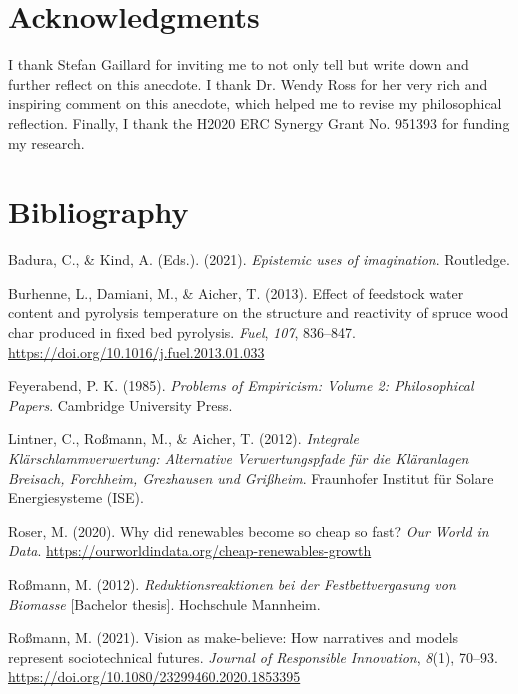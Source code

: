 \documentclass[authordate, anecdote]{jote-new-article}
\begin{document}
	\section{Acknowledgments}



	I thank Stefan Gaillard for inviting me to not only tell but write down and further reflect on this anecdote. I thank Dr. Wendy Ross for her very rich and inspiring comment on this anecdote, which helped me to revise my philosophical reflection. Finally, I thank the H2020 ERC Synergy Grant No. 951393 for funding my research.



	\section{Bibliography}



	Badura, C., \& Kind, A. (Eds.). (2021). \emph{Epistemic uses of imagination}. Routledge.



	Burhenne, L., Damiani, M., \& Aicher, T. (2013). Effect of feedstock water content and pyrolysis temperature on the structure and reactivity of spruce wood char produced in fixed bed pyrolysis. \emph{Fuel}, \emph{107}, 836--847. \url{https://doi.org/10.1016/j.fuel.2013.01.033}



	Feyerabend, P. K. (1985).\emph{ Problems of Empiricism: Volume 2: Philosophical Papers}. Cambridge University Press.



	Lintner, C., Roßmann, M., \& Aicher, T. (2012). \emph{Integrale Klärschlammverwertung: Alternative Verwertungspfade für die Kläranlagen Breisach, Forchheim, Grezhausen und Grißheim}. Fraunhofer Institut für Solare Energiesysteme (ISE).



	Roser, M. (2020). Why did renewables become so cheap so fast? \emph{Our World in Data}. \url{https://ourworldindata.org/cheap-renewables-growth}



	Roßmann, M. (2012). \emph{Reduktionsreaktionen bei der Festbettvergasung von Biomasse} [Bachelor thesis]. Hochschule Mannheim.



	Roßmann, M. (2021). Vision as make-believe: How narratives and models represent sociotechnical futures. \emph{Journal of Responsible Innovation}, \emph{8}(1), 70--93. \url{https://doi.org/10.1080/23299460.2020.1853395}
\end{document}
